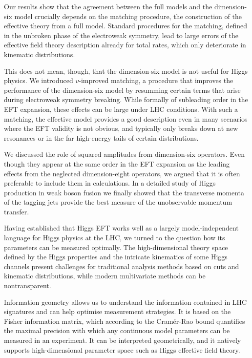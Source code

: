Our results show that the agreement between the full models and the
dimension-six model crucially depends on the matching procedure, \ie
the construction of the effective theory from a full model. Standard
procedures for the matching, defined in the unbroken phase of the
electroweak symmetry, lead to large errors of the effective field
theory description already for total rates, which only deteriorate
in kinematic distributions.

This does not mean, though, that the dimension-six model is not useful for
Higgs physics. We introduced $v$-improved matching, a procedure that
improves the performance of the dimension-six model by resumming
certain terms that arise during electroweak symmetry breaking. While
formally of subleading order in the EFT expansion, these effects can
be large under LHC conditions. With such a matching, the effective
model provides a good description even in many scenarios where the EFT
validity is not obvious, and typically only breaks down at new
resonances or in the far high-energy tails of certain distributions.

We discussed the role of squared amplitudes from dimension-six
operators. Even though they appear at the same order in the EFT
expansion as the leading effects from the neglected dimension-eight
operators, we argued that it is often preferable to include them
in calculations. In a detailed study of Higgs production in weak boson
fusion we finally showed that the transverse momenta of the tagging
jets provide the best measure of the unobservable momentum transfer.

\newparagraph
%
Having established that Higgs EFT works well as a largely
model-independent language for Higgs physics at the LHC, we turned to
the question how its parameters can be measured optimally. The
high-dimensional theory space defined by the Higgs properties and the
intricate kinematics of some Higgs channels present challenges for
traditional analysis methods based on cuts and kinematic
distributions, while modern multivariate methods can be nontransparent.

Information geometry allows us to understand the information contained
in LHC signatures and can help optimise measurement strategies. It is
based on the Fisher information matrix, which according to the
Cram\'er-Rao bound quantifies the maximal precision with which any
continuous model parameters can be measured in an experiment. It can be
interpreted geometrically, and it natively supports high-dimensional
parameter space such as Higgs effective field theory.

